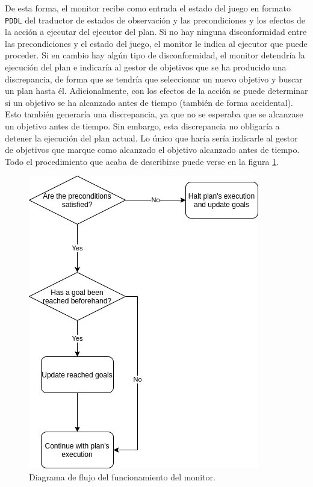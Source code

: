 De esta forma, el monitor recibe como entrada el estado del juego en formato \texttt{PDDL} del
traductor de estados de observación y las precondiciones y los efectos de la acción a ejecutar
del ejecutor del plan. Si no hay ninguna disconformidad entre las precondiciones y el estado del juego,
el monitor le indica al ejecutor que puede proceder. Si en cambio hay algún tipo de disconformidad,
el monitor detendría la ejecución del plan e indicaría al gestor de objetivos que se ha producido
una discrepancia, de forma que se tendría que seleccionar un nuevo objetivo y buscar un plan hasta
él. Adicionalmente, con los efectos de la acción se puede determinar si un objetivo se ha alcanzado
antes de tiempo (también de forma accidental). Esto también generaría una discrepancia, ya que no se
esperaba que se alcanzase un objetivo antes de tiempo. Sin embargo, esta discrepancia no obligaría
a detener la ejecución del plan actual. Lo único que haría sería indicarle al gestor de objetivos
que marque como alcanzado el objetivo alcanzado antes de tiempo. Todo el procedimiento que acaba de describirse
puede verse en la figura \ref{fig:flux-monitor}.

\begin{figure}[H]
    \centering
    \includegraphics[scale=0.45]{img/CH05/flux_monitor.png}
    \caption{Diagrama de flujo del funcionamiento del monitor.}
    \label{fig:flux-monitor}
\end{figure}

